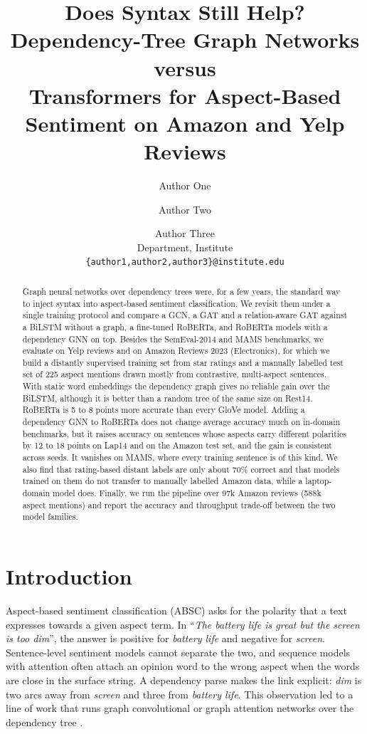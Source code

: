 \documentclass[11pt]{article}
\title{Does Syntax Still Help? Dependency-Tree Graph Networks versus\\Transformers for Aspect-Based Sentiment on Amazon and Yelp Reviews}
\author{Author One \and Author Two \and Author Three \\
  Department, Institute \\
  \texttt{\{author1,author2,author3\}@institute.edu}}
\begin{document}
\maketitle

\begin{abstract}
Graph neural networks over dependency trees were, for a few years, the standard way to inject syntax into aspect-based sentiment classification. We revisit them under a single training protocol and compare a GCN, a GAT and a relation-aware GAT against a BiLSTM without a graph, a fine-tuned RoBERTa, and RoBERTa models with a dependency GNN on top. Besides the SemEval-2014 and MAMS benchmarks, we evaluate on Yelp reviews and on Amazon Reviews 2023 (Electronics), for which we build a distantly supervised training set from star ratings and a manually labelled test set of 225 aspect mentions drawn mostly from contrastive, multi-aspect sentences. With static word embeddings the dependency graph gives no reliable gain over the BiLSTM, although it is better than a random tree of the same size on Rest14. RoBERTa is 5 to 8 points more accurate than every GloVe model. Adding a dependency GNN to RoBERTa does not change average accuracy much on in-domain benchmarks, but it raises accuracy on sentences whose aspects carry different polarities by 12 to 18 points on Lap14 and on the Amazon test set, and the gain is consistent across seeds. It vanishes on MAMS, where every training sentence is of this kind. We also find that rating-based distant labels are only about 70\% correct and that models trained on them do not transfer to manually labelled Amazon data, while a laptop-domain model does. Finally, we run the pipeline over 97k Amazon reviews (588k aspect mentions) and report the accuracy and throughput trade-off between the two model families.
\end{abstract}

\section{Introduction}

Aspect-based sentiment classification (ABSC) asks for the polarity that a text expresses towards a given aspect term. In ``\textit{The battery life is great but the screen is too dim}'', the answer is positive for \textit{battery life} and negative for \textit{screen}. Sentence-level sentiment models cannot separate the two, and sequence models with attention \citep{wang-etal-2016-attention,tang-etal-2016-aspect} often attach an opinion word to the wrong aspect when the words are close in the surface string. A dependency parse makes the link explicit: \textit{dim} is two arcs away from \textit{screen} and three from \textit{battery life}. This observation led to a line of work that runs graph convolutional \citep{kipf2017semi} or graph attention \citep{velickovic2018graph} networks over the dependency tree \citep{zhang-etal-2019-aspect,sun-etal-2019-aspect,huang-carley-2019-syntax,wang-etal-2020-relational,li-etal-2021-dual}.
\end{document}

